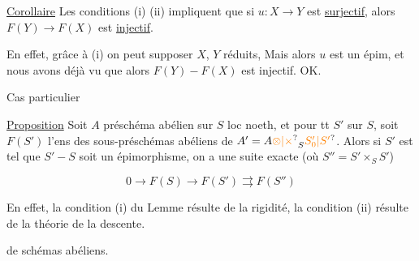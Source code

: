 \uline{Corollaire} Les conditions (i) (ii) impliquent que si $u\colon X\to Y$ est \uline{surjectif}, alors $F(Y)\to F(X)$ est \uline{injectif}.

En effet, grâce à (i) on peut supposer  $X$, $Y$ réduits, Mais alors $u$ est un épim, et nous avons déjà vu que  alors $F(Y)\mathrel{-}F(X)$ est injectif. OK.


Cas particulier

\uline{Proposition}  Soit $A$ préschéma abélien sur $S$ loc noeth, et pour tt $S'$ sur $S$, soit $F(S')$ l'ens des sous-préschémas abéliens de $A'=A\unsure{\otimes|\times}_S\unsure{S'_0|S'}$. Alors si $S'$ est tel que $S'\mathrel{-}S$ soit un épimorphisme, on a une suite exacte (où $S''=S'\times_S S'$)

\[
0\longrightarrow F(S)\longrightarrow F(S')\rightrightarrows F(S'')
\]

En effet, la condition (i) du Lemme résulte de la rigidité, la condition (ii) résulte de la théorie de la descente.

    de schémas abéliens.


